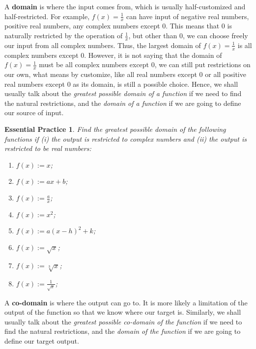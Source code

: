 \documentclass[12pt]{article}
\newtheorem{exercise}{Essential Practice}[subsubsection]
\begin{document}
    A \textbf{domain} is where the input comes from, which is usually half-customized and half-restricted. For example, $f(x)=\frac{1}{x}$ can have input of negative real numbers, positive real numbers, any complex numbers except 0. This means that 0 is naturally restricted by the operation of $\frac{1}{x}$, but other than 0, we can choose freely our input from all complex numbers. Thus, the largest domain of $f(x)=\frac{1}{x}$ is all complex numbers except 0. However, it is not saying that the domain of $f(x)=\frac{1}{x}$ must be all complex numbers except 0, we can still put restrictions on our own, what means by customize, like all real numbers except 0 or all positive real numbers except 0 as its domain, is still a possible choice. Hence, we shall usually talk about the \textit{greatest possible domain of a function} if we need to find the natural restrictions, and the \textit{domain of a function} if we are going to define our source of input.

    \begin{exercise}
        Find the greatest possible domain of the following functions if (i) the output is restricted to complex numbers and (ii) the output is restricted to be real numbers:\begin{enumerate}
            \item $f(x):=x$;
            \item $f(x):=ax+b$;
            \item $f(x):=\frac{a}{x}$;
            \item $f(x):=x^2$;
            \item $f(x):=a(x-h)^2+k$;
            \item $f(x):=\sqrt{x}$;
            \item $f(x):=\sqrt[3]{x}$;
            \item $f(x):=\frac{1}{\sqrt{x}}$;
        \end{enumerate}
    \end{exercise}

    A \textbf{co-domain} is where the output can go to. It is more likely a limitation of the output of the function so that we know where our target is. Similarly, we shall usually talk about the \textit{greatest possible co-domain of the function} if we need to find the natural restrictions, and the \textit{domain of the function} if we are going to define our target output.
\end{document}
